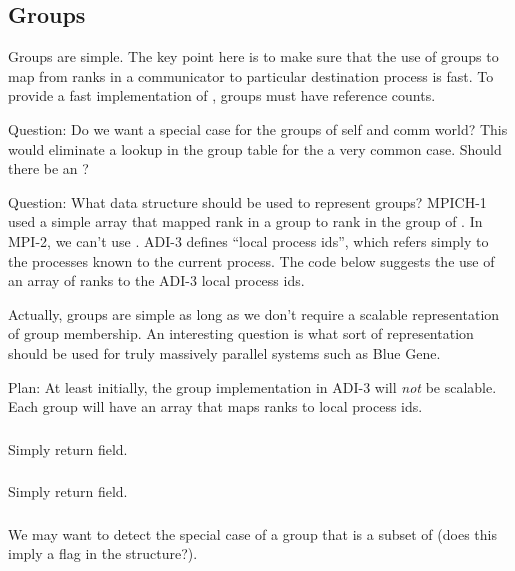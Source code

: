 \documentclass{article}
\begin{document}
\subsection{Groups}
\label{sec:groups}

Groups are simple.  The key point here is to make sure that the use of
groups to map from ranks in a communicator to particular destination
process is fast.
To provide a fast implementation of , groups must
have reference counts.  

Question: Do we want a special case for the groups of self and comm
world?  This would eliminate a lookup in the group table for the a very
common case.  Should there be an ?  

Question: What data structure should be used to represent groups?
MPICH-1 used a simple array that mapped rank in a group to rank in the
group of .  In MPI-2, we can't use
.  ADI-3 defines ``local process ids'', which
refers simply to the processes known to the current process.  The code below
suggests the use of an array of ranks to the ADI-3 local process ids.


Actually, groups are simple as long as we don't require a scalable
representation of group membership.  An interesting question is what
sort of representation should be used for truly massively parallel
systems such as Blue Gene.  

Plan: At least initially, the group implementation in ADI-3 will \emph{not} be
scalable.  Each group will have an array that maps ranks to local process ids.

\subsubsection{}
Simply return  field.

\subsubsection{}
Simply return  field.

\subsubsection{}
We may want to detect the special case of a group that is a subset of
 (does this imply a flag in the 
structure?).  
\end{document}
